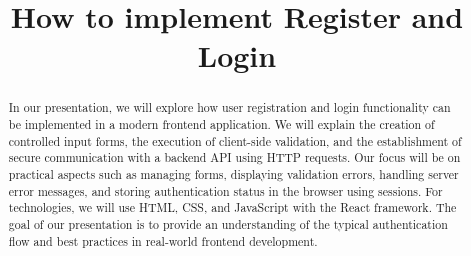 \documentclass{article}
\title{How to implement Register and Login}
\author{}
\date{}
\begin{document}
\maketitle

\begin{abstract}
In our presentation, we will explore how user registration and login functionality can be implemented in a modern frontend application. We will explain the creation of controlled input forms, the execution of client-side validation, and the establishment of secure communication with a backend API using HTTP requests. Our focus will be on practical aspects such as managing forms, displaying validation errors, handling server error messages, and storing authentication status in the browser using sessions. For technologies, we will use HTML, CSS, and JavaScript with the React framework. The goal of our presentation is to provide an understanding of the typical authentication flow and best practices in real-world frontend development.
\end{abstract}
\end{document}
